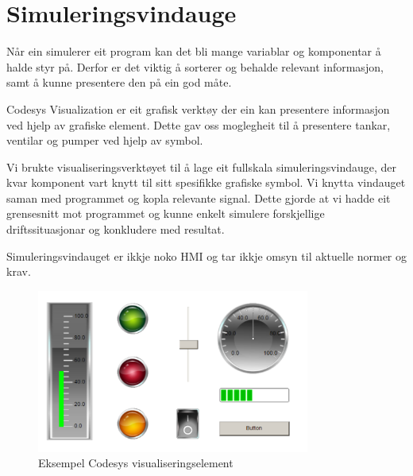 \section{Simuleringsvindauge}
\thispagestyle{fancy}

Når ein simulerer eit program kan det bli mange variablar og komponentar
å halde styr på. Derfor er det viktig å sorterer og behalde relevant informasjon, 
samt å kunne presentere den på ein god måte.

\gls{Codesys} Visualization \citep{CodesysVizualisation} er eit grafisk verktøy der ein kan presentere informasjon ved hjelp av grafiske element. 
Dette gav oss moglegheit til å presentere tankar, ventilar og pumper ved hjelp av symbol. 

Vi brukte visualiseringsverktøyet til å lage eit fullskala simuleringsvindauge, der kvar komponent vart knytt til sitt spesifikke grafiske symbol.
Vi knytta vindauget saman med programmet og kopla relevante signal.
Dette gjorde at vi hadde eit grensesnitt mot programmet og kunne enkelt simulere
forskjellige driftssituasjonar og konkludere med resultat.

Simuleringsvindauget er ikkje noko \gls{HMI} og tar ikkje omsyn til aktuelle normer og krav.

\begin{figure}[htbp]
    \centering
    \includegraphics[width=0.8\textwidth]{Bilder/Codesys symbol.png}
    \caption{Eksempel \gls{Codesys} visualiseringselement}\label{fig:CodesysVisualisering}
\end{figure}

\newpage
